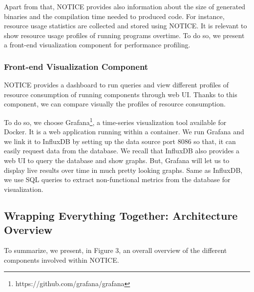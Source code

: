 Apart from that, NOTICE provides also information about the size of generated binaries and the compilation time needed to produced code.
For instance, resource usage statistics are collected and stored using NOTICE. It is relevant to show resource usage profiles of running programs overtime. To do so, we present a front-end visualization component for performance profiling. 

\subsubsection{Front-end Visualization Component}
NOTICE provides a dashboard to run queries and view different profiles of resource consumption of running components through web UI. 
Thanks to this component, we can compare visually the profiles of resource consumption. 

To do so, we choose Grafana\footnote{https://github.com/grafana/grafana}, a time-series visualization tool available for Docker. It is a web application running within a container. We run Grafana and we link it to InfluxDB by setting up the data source port 8086 so that, it can easily request data from the database. 
We recall that InfluxDB also provides a web UI to query the database and show graphs. But, Grafana will let us to display live results over time in much pretty looking graphs. Same as InfluxDB, we use SQL queries to extract non-functional metrics from the database for visualization.

\subsection{Wrapping Everything Together: Architecture Overview}
To summarize, we present, in Figure 3, an overall overview of the different components involved within NOTICE.

